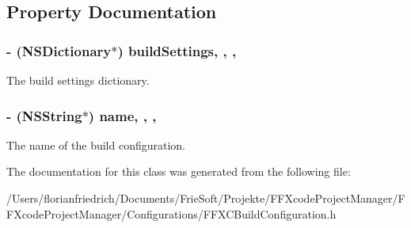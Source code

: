 \subsection{Property Documentation}
\hypertarget{interface_f_f_x_c_build_configuration_a54f1a8056f0436256553fca442d9fee8}{
\subsubsection[{build\-Settings}]{\setlength{\rightskip}{0pt plus 5cm}-\/ (N\-S\-Dictionary$\ast$) build\-Settings\hspace{0.3cm}{\ttfamily [read]}, {\ttfamily [write]}, {\ttfamily [nonatomic]}, {\ttfamily [strong]}}}\label{interface_f_f_x_c_build_configuration_a54f1a8056f0436256553fca442d9fee8}
The build settings dictionary. \hypertarget{interface_f_f_x_c_build_configuration_a4b93d352d2fca75b34e1b5a50e03f587}{
\subsubsection[{name}]{\setlength{\rightskip}{0pt plus 5cm}-\/ (N\-S\-String$\ast$) name\hspace{0.3cm}{\ttfamily [read]}, {\ttfamily [write]}, {\ttfamily [nonatomic]}, {\ttfamily [strong]}}}\label{interface_f_f_x_c_build_configuration_a4b93d352d2fca75b34e1b5a50e03f587}
The name of the build configuration. 

The documentation for this class was generated from the following file\-:\begin{DoxyCompactItemize}
\item 
/\-Users/florianfriedrich/\-Documents/\-Frie\-Soft/\-Projekte/\-F\-F\-Xcode\-Project\-Manager/\-F\-F\-Xcode\-Project\-Manager/\-Configurations/F\-F\-X\-C\-Build\-Configuration.\-h\end{DoxyCompactItemize}
